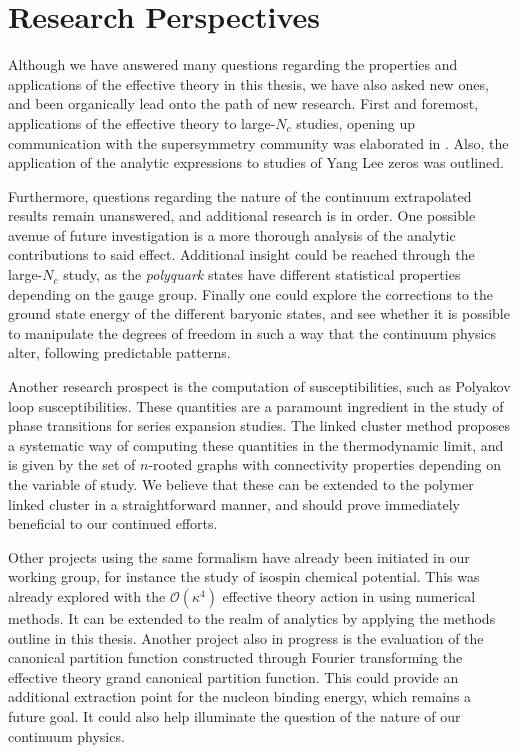 \chapter{Research Perspectives}

Although we have answered many questions regarding the properties and
applications of the effective theory in this thesis, we have also asked new
ones, and been organically lead onto the path of new research. First and
foremost, applications of the effective theory to large-$N_c$ studies, opening
up communication with the supersymmetry community was elaborated in
. Also, the application of the analytic expressions
to studies of Yang Lee zeros was outlined.

Furthermore, questions regarding the nature of the continuum extrapolated
results remain unanswered, and additional research is in order. One possible
avenue of future investigation is a more thorough analysis of the analytic
contributions to said effect. Additional insight could be reached through the
large-$N_c$ study, as the \emph{polyquark} states have different statistical
properties depending on the gauge group. Finally one could explore the
corrections to the ground state energy of the different baryonic states, and see
whether it is possible to manipulate the degrees of freedom in such a way that
the continuum physics alter, following predictable patterns.

Another research prospect is the computation of susceptibilities, such as
Polyakov loop susceptibilities. These quantities are a paramount ingredient in
the study of phase transitions for series expansion studies. The linked cluster
method proposes a systematic way of computing these quantities in the
thermodynamic limit, and is given by the set of $n$-rooted graphs with
connectivity properties depending on the variable of study. We believe that
these can be extended to the polymer linked cluster in a straightforward manner,
and should prove immediately beneficial to our continued efforts.

Other projects using the same formalism have already been initiated in our
working group, for instance the study of isospin chemical potential. This was
already explored with the $\mathcal{O}(\kappa^4)$ effective theory action in
\citep{Langelage:2014vpa} using numerical methods. It can be extended to the
realm of analytics by applying the methods outline in this thesis. Another
project also in progress is the evaluation of the canonical partition function
constructed through Fourier transforming the effective theory grand canonical
partition function. This could provide an additional extraction point for the
nucleon binding energy, which remains a future goal. It could also help
illuminate the question of the nature of our continuum physics.

